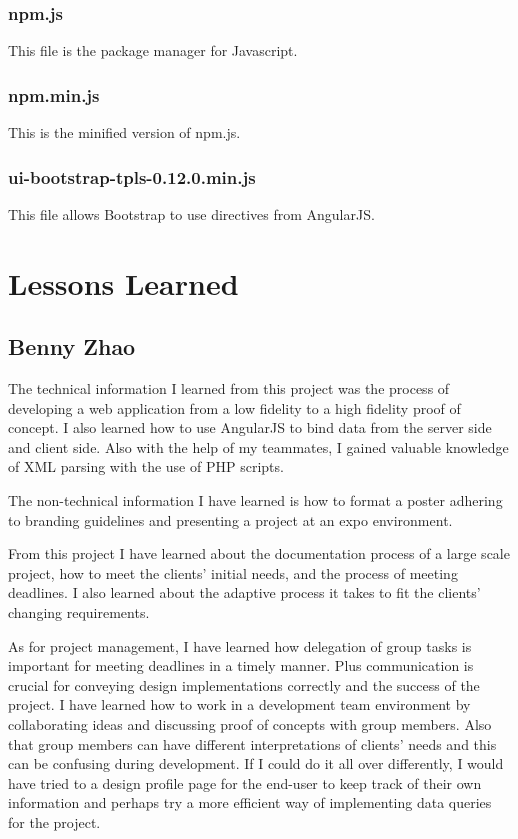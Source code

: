\documentclass[onecolumn]{IEEEtran}
\begin{document}
\subsubsection{npm.js}
This file is the package manager for Javascript. 

\subsubsection{npm.min.js}
This is the minified version of npm.js. 

\subsubsection{ui-bootstrap-tpls-0.12.0.min.js}
This file allows Bootstrap to use directives from AngularJS. 

\section{Lessons Learned}

\subsection{Benny Zhao}
The technical information I learned from this project was the process of developing a web application from a low fidelity to a high fidelity proof of concept. I also learned how to use AngularJS to bind data from the server side and client side. Also with the help of my teammates, I gained valuable knowledge of XML parsing with the use of PHP scripts.  

The non-technical information I have learned is how to format a poster adhering to branding guidelines and presenting a project at an expo environment. 

From this project I have learned about the documentation process of a large scale project, how to meet the clients' initial needs, and the process of meeting deadlines. I also learned about the adaptive process it takes to fit the clients' changing requirements. 

As for project management, I have learned how delegation of group tasks is important for meeting deadlines in a timely manner. Plus communication is crucial for conveying design implementations correctly and the success of the project.  
I have learned how to work in a development team environment by collaborating ideas and discussing proof of concepts with group members. Also that group members can have different interpretations of clients' needs and this can be confusing during development. 
If I could do it all over differently, I would have tried to a design profile page for the end-user to keep track of their own information and perhaps try a more efficient way of implementing data queries for the project.  
\end{document}
